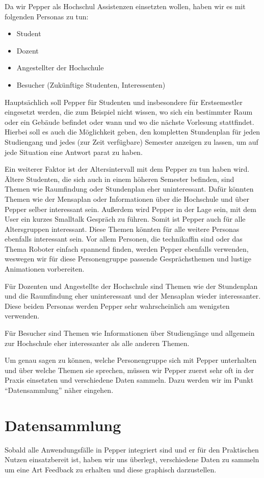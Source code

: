 Da wir Pepper als Hochschul Assistenzen einsetzten wollen, haben wir es mit folgenden Personas zu tun:
\begin{itemize}
    \item Student
    \item Dozent
    \item Angestellter der Hochschule
    \item Besucher (Zukünftige Studenten, Interessenten)
\end{itemize}

Hauptsächlich soll Pepper für Studenten und insbesondere für Erstsemestler eingesetzt werden, die zum Beispiel nicht wissen, wo sich ein bestimmter Raum oder ein Gebäude befindet oder wann und wo die nächste Vorlesung stattfindet. Hierbei soll es auch die Möglichkeit geben, den kompletten Stundenplan für jeden Studiengang und jedes (zur Zeit verfügbare) Semester anzeigen zu lassen, um auf jede Situation eine Antwort parat zu haben.

Ein weiterer Faktor ist der Altersintervall mit dem Pepper zu tun haben wird. Ältere Studenten, die sich auch in einem höheren Semester befinden, sind Themen wie Raumfindung oder Stundenplan eher uninteressant. Dafür könnten Themen wie der Mensaplan oder Informationen über die Hochschule und über Pepper selber interessant sein. Außerdem wird Pepper in der Lage sein, mit dem User ein kurzes Smalltalk Gespräch zu führen. Somit ist Pepper auch für alle Altersgruppen interessant. Diese Themen könnten für alle weitere Personas ebenfalls interessant sein. Vor allem Personen, die technikaffin sind oder das Thema Roboter einfach spannend finden, werden Pepper ebenfalls verwenden, weswegen wir für diese Personengruppe passende Gesprächsthemen und lustige Animationen vorbereiten.

Für Dozenten und Angestellte der Hochschule sind Themen wie der Stundenplan und die Raumfindung eher uninteressant und der Mensaplan wieder interessanter. Diese beiden Personas werden Pepper sehr wahrscheinlich am wenigsten verwenden. 

Für Besucher sind Themen wie Informationen über Studiengänge und allgemein zur Hochschule eher interessanter als alle anderen Themen. 

Um genau sagen zu können, welche Personengruppe sich mit Pepper unterhalten und über welche Themen sie sprechen, müssen wir Pepper zuerst sehr oft in der Praxis einsetzten und verschiedene Daten sammeln. Dazu werden wir im Punkt “Datensammlung” näher eingehen.


\section{Datensammlung}
Sobald alle Anwendungsfälle in Pepper integriert sind und er für den Praktischen Nutzen einsatzbereit ist, haben wir uns überlegt, verschiedene Daten zu sammeln um eine Art Feedback zu erhalten und diese graphisch darzustellen.

